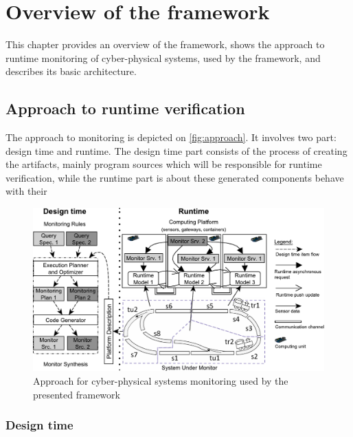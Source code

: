 
\chapter{Overview of the framework}


This chapter provides an overview of the framework, shows the approach to runtime monitoring of cyber-physical systems, used by the framework, and describes its basic architecture.

\section{Approach to runtime verification}

The approach to monitoring is depicted on \autoref{fig:approach}. 
It involves two part: design time and runtime.
The design time part consists of the process of creating the artifacts, mainly program sources which will be responsible for runtime verification, 
while the runtime part is about these generated components behave with their 

\begin{figure}[h]
	\begin{center}
		\includegraphics[width=\textwidth]{figures/fase-overview-crop.pdf}
		\caption{Approach for cyber-physical systems monitoring used by the presented framework }
		\label{fig:approach}
	\end{center}
\end{figure}

\subsection{Design time}

